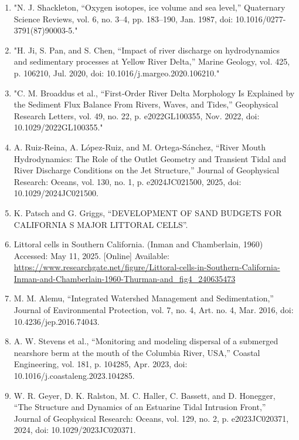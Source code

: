 \documentclass{article}
\begin{document}
\begin{sloppypar}
\begin{enumerate}
    \item{"N. J. Shackleton, “Oxygen isotopes, ice volume and sea level,” Quaternary Science Reviews, vol. 6, no. 3–4, pp. 183–190, Jan. 1987, doi: 10.1016/0277-3791(87)90003-5."}

    \item{"H. Ji, S. Pan, and S. Chen, “Impact of river discharge on hydrodynamics and sedimentary processes at Yellow River Delta,” Marine Geology, vol. 425, p. 106210, Jul. 2020, doi: 10.1016/j.margeo.2020.106210."}

    \item{"C. M. Broaddus et al., “First‐Order River Delta Morphology Is Explained by the Sediment Flux Balance From Rivers, Waves, and Tides,” Geophysical Research Letters, vol. 49, no. 22, p. e2022GL100355, Nov. 2022, doi: 10.1029/2022GL100355."}

    \item{A. Ruiz-Reina, A. López-Ruiz, and M. Ortega-Sánchez, “River Mouth Hydrodynamics: The Role of the Outlet Geometry and Transient Tidal and River Discharge Conditions on the Jet Structure,” Journal of Geophysical Research: Oceans, vol. 130, no. 1, p. e2024JC021500, 2025, doi: 10.1029/2024JC021500.}

    \item{K. Patsch and G. Griggs, “DEVELOPMENT OF SAND BUDGETS FOR CALIFORNIA S MAJOR LITTORAL CELLS”.}

    \item{Littoral cells in Southern California. (Inman and Chamberlain, 1960) Accessed: May 11, 2025. [Online] Available: \url{https://www.researchgate.net/figure/Littoral-cells-in-Southern-California-Inman-and-Chamberlain-1960-Thurman-and_fig4_240635473}}


    \item{M. M. Alemu, “Integrated Watershed Management and Sedimentation,” Journal of Environmental Protection, vol. 7, no. 4, Art. no. 4, Mar. 2016, doi: 10.4236/jep.2016.74043.}

    \item{A. W. Stevens et al., “Monitoring and modeling dispersal of a submerged nearshore berm at the mouth of the Columbia River, USA,” Coastal Engineering, vol. 181, p. 104285, Apr. 2023, doi: 10.1016/j.coastaleng.2023.104285.}

    \item{W. R. Geyer, D. K. Ralston, M. C. Haller, C. Bassett, and D. Honegger, “The Structure and Dynamics of an Estuarine Tidal Intrusion Front,” Journal of Geophysical Research: Oceans, vol. 129, no. 2, p. e2023JC020371, 2024, doi: 10.1029/2023JC020371.}


\end{enumerate}
\end{sloppypar}
\end{document}
